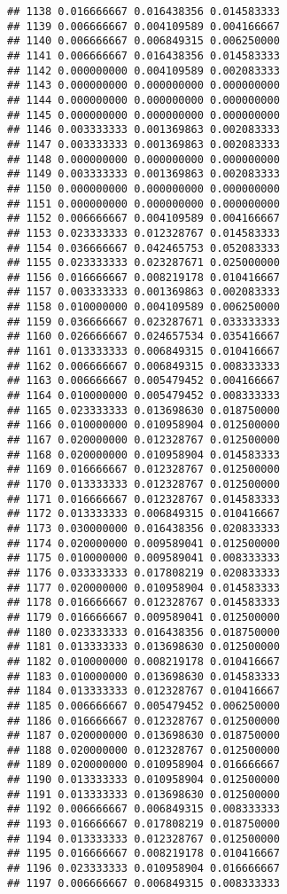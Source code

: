 \documentclass[
]{article}
\begin{document}
\begin{verbatim}
## 1138 0.016666667 0.016438356 0.014583333
## 1139 0.006666667 0.004109589 0.004166667
## 1140 0.006666667 0.006849315 0.006250000
## 1141 0.006666667 0.016438356 0.014583333
## 1142 0.000000000 0.004109589 0.002083333
## 1143 0.000000000 0.000000000 0.000000000
## 1144 0.000000000 0.000000000 0.000000000
## 1145 0.000000000 0.000000000 0.000000000
## 1146 0.003333333 0.001369863 0.002083333
## 1147 0.003333333 0.001369863 0.002083333
## 1148 0.000000000 0.000000000 0.000000000
## 1149 0.003333333 0.001369863 0.002083333
## 1150 0.000000000 0.000000000 0.000000000
## 1151 0.000000000 0.000000000 0.000000000
## 1152 0.006666667 0.004109589 0.004166667
## 1153 0.023333333 0.012328767 0.014583333
## 1154 0.036666667 0.042465753 0.052083333
## 1155 0.023333333 0.023287671 0.025000000
## 1156 0.016666667 0.008219178 0.010416667
## 1157 0.003333333 0.001369863 0.002083333
## 1158 0.010000000 0.004109589 0.006250000
## 1159 0.036666667 0.023287671 0.033333333
## 1160 0.026666667 0.024657534 0.035416667
## 1161 0.013333333 0.006849315 0.010416667
## 1162 0.006666667 0.006849315 0.008333333
## 1163 0.006666667 0.005479452 0.004166667
## 1164 0.010000000 0.005479452 0.008333333
## 1165 0.023333333 0.013698630 0.018750000
## 1166 0.010000000 0.010958904 0.012500000
## 1167 0.020000000 0.012328767 0.012500000
## 1168 0.020000000 0.010958904 0.014583333
## 1169 0.016666667 0.012328767 0.012500000
## 1170 0.013333333 0.012328767 0.012500000
## 1171 0.016666667 0.012328767 0.014583333
## 1172 0.013333333 0.006849315 0.010416667
## 1173 0.030000000 0.016438356 0.020833333
## 1174 0.020000000 0.009589041 0.012500000
## 1175 0.010000000 0.009589041 0.008333333
## 1176 0.033333333 0.017808219 0.020833333
## 1177 0.020000000 0.010958904 0.014583333
## 1178 0.016666667 0.012328767 0.014583333
## 1179 0.016666667 0.009589041 0.012500000
## 1180 0.023333333 0.016438356 0.018750000
## 1181 0.013333333 0.013698630 0.012500000
## 1182 0.010000000 0.008219178 0.010416667
## 1183 0.010000000 0.013698630 0.014583333
## 1184 0.013333333 0.012328767 0.010416667
## 1185 0.006666667 0.005479452 0.006250000
## 1186 0.016666667 0.012328767 0.012500000
## 1187 0.020000000 0.013698630 0.018750000
## 1188 0.020000000 0.012328767 0.012500000
## 1189 0.020000000 0.010958904 0.016666667
## 1190 0.013333333 0.010958904 0.012500000
## 1191 0.013333333 0.013698630 0.012500000
## 1192 0.006666667 0.006849315 0.008333333
## 1193 0.016666667 0.017808219 0.018750000
## 1194 0.013333333 0.012328767 0.012500000
## 1195 0.016666667 0.008219178 0.010416667
## 1196 0.023333333 0.010958904 0.016666667
## 1197 0.006666667 0.006849315 0.008333333

\end{verbatim}
\end{document}
